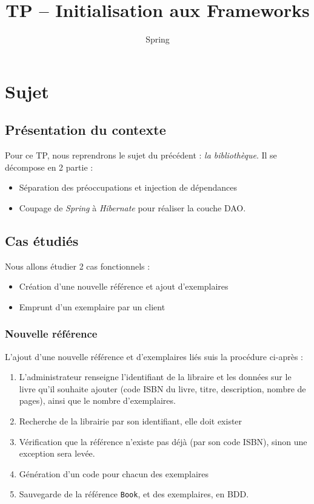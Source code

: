 \documentclass[small,algo]{dushClass}
\title{TP -- Initialisation aux Frameworks}
\subtitle{Spring}
\begin{document}
\section{Sujet}

\subsection{Présentation du contexte}

Pour ce TP, nous reprendrons le sujet du précédent : \emph{la bibliothèque}. Il se décompose en 2 partie :
\begin{itemize}
\item Séparation des préoccupations et injection de dépendances
\item Coupage de \emph{Spring} à \emph{Hibernate} pour réaliser la couche DAO.
\end{itemize}

\subsection{Cas étudiés}

Nous allons étudier 2 cas fonctionnels :
\begin{itemize}
\item Création d'une nouvelle référence et ajout d'exemplaires
\item Emprunt d'un exemplaire par un client%
\end{itemize}

\subsubsection{Nouvelle référence}
L'ajout d'une nouvelle référence et d'exemplaires liés suis la procédure ci-après :
\begin{enumerate}
\item\label{add-ihm} L'administrateur renseigne l'identifiant de la libraire et les données sur le livre qu'il souhaite ajouter (code ISBN du livre, titre, description, nombre de pages), ainsi que le nombre d'exemplaires.
\item Recherche de la librairie par son identifiant, elle doit exister
\item Vérification que la référence n'existe pas déjà (par son code ISBN), sinon une exception sera levée.
\item Génération d'un code pour chacun des exemplaires
\item Sauvegarde de la référence \texttt{Book}, et des exemplaires, en BDD.\\
\end{enumerate}
\end{document}
